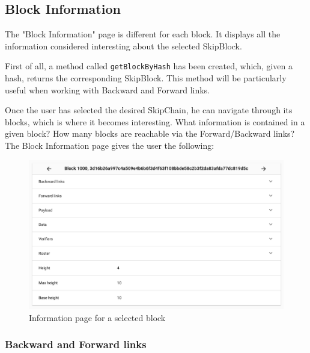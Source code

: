 \documentclass[11pt, a4paper, twoside, openright]{article} %
\begin{document}
{\subsection{Block Information}
The "Block Information" page is different for each block. It displays all the information considered interesting about the selected SkipBlock.

First of all, a method called \verb|getBlockByHash| has been created, which, given a hash, returns the corresponding SkipBlock. This method will be particularly useful when working with Backward and Forward links.


Once the user has selected the desired SkipChain, he can navigate through its blocks, which is where it becomes interesting. What information is contained in a given block? How many blocks are reachable via the Forward/Backward links?
The Block Information page gives the user the following:

\begin{figure}[h]
    \centering
    \includegraphics[width=\textwidth]{BlockInfo.png}
    \caption{Information page for a selected block}
    \label{fig:my_label}
\end{figure}
\newpage
\subsubsection{Backward and Forward links}


}
\end{document}
